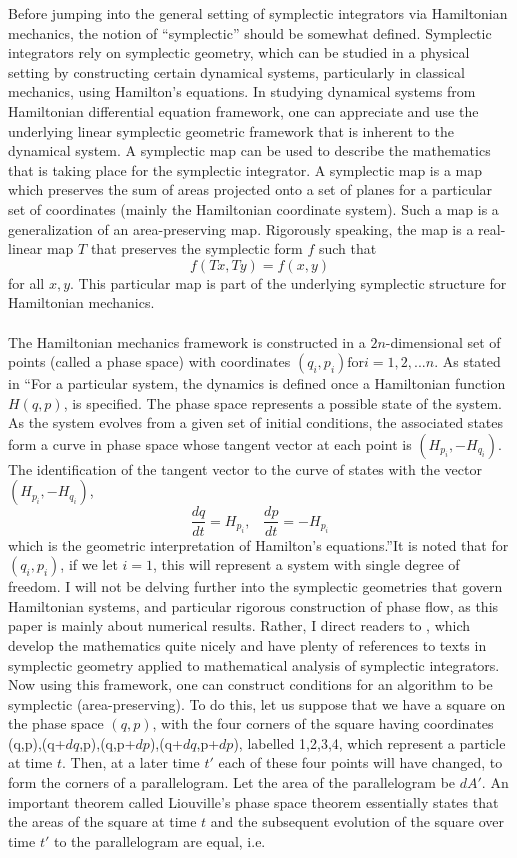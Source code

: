 \documentclass[12pt]{article}
\begin{document}
Before jumping into the general setting of symplectic integrators via Hamiltonian mechanics, the notion of ``symplectic'' should be somewhat defined. Symplectic integrators rely on symplectic geometry, which can be studied in a physical setting by constructing certain dynamical systems, particularly in classical mechanics, using Hamilton's equations. In studying dynamical systems from Hamiltonian differential equation framework, one can appreciate and use the underlying linear symplectic geometric framework that is inherent to the dynamical system. A symplectic map can be used to describe the mathematics that is taking place for the symplectic integrator. A symplectic map is a map which preserves the sum of areas projected onto a set of planes for a particular set of coordinates (mainly the Hamiltonian coordinate system). Such a map is a generalization of an area-preserving map. Rigorously speaking, the map is a real-linear map $T$ that preserves the symplectic form $f$ such that
\[f(Tx,Ty)=f(x,y)\]
for all $x,y$. This particular map is part of the underlying symplectic structure for Hamiltonian mechanics. \\\\
\indent The Hamiltonian mechanics framework is constructed in a $2n$-dimensional set of points (called a phase space) with coordinates $(q_i,p_i) \text{for} i=1,2,...n$. As stated in \cite{DR} ``For a particular system, the dynamics is defined once a Hamiltonian function $H(q,p)$, is specified. The phase space represents a possible state of the system. As the system evolves from a given set of initial conditions, the associated states form a curve in phase space whose tangent vector at each point is $(H_{p_i},-H_{q_i})$. The identification of the tangent vector to the curve of states with the vector $(H_{p_i},-H_{q_i})$,
\[\frac{dq}{dt}=H_{p_i}, \;\;\; \frac{dp}{dt}=-H_{p_i}\] 
which is the geometric interpretation of Hamilton's equations.''It is noted that for $(q_i,p_i)$, if we let $i=1$, this will represent a system with single degree of freedom. I will not be delving further into the symplectic geometries that govern Hamiltonian systems, and particular rigorous construction of phase flow, as this paper is mainly about numerical results. Rather, I direct readers to \cite{DR}, \cite{MPS} which develop the mathematics quite nicely and have plenty of references to texts in symplectic geometry applied to mathematical analysis of symplectic integrators.  Now using this framework, one can construct conditions for an algorithm to be symplectic (area-preserving). To do this, let us suppose that we have a square on the phase space $(q,p)$, with the four corners of the square having coordinates (q,p),(q+$dq$,p),(q,p+$dp$),(q+$dq$,p+$dp$), labelled 1,2,3,4, which represent a particle at time $t$. Then, at a later time $t'$ each of these four points will have changed, to form the corners of a parallelogram. Let the area of the parallelogram be $dA'$. An important theorem called Liouville's phase space theorem essentially states that the areas of the square at time $t$ and the subsequent evolution of the square over time $t'$ to the parallelogram are equal, i.e.
\end{document}
